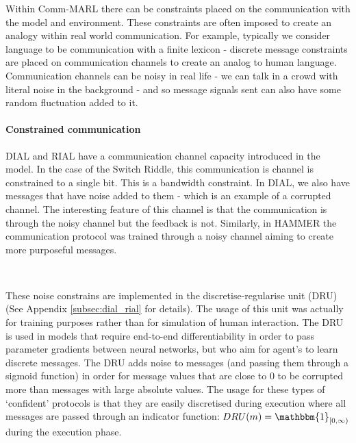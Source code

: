 \documentclass{article}
\begin{document}
Within Comm-MARL there can be constraints placed on the communication with the model and environment. These constraints are often imposed to create an analogy within real world communication. For example, typically we consider language to be communication with a finite lexicon - discrete message constraints are placed on communication channels to create an analog to human language. Communication channels can be noisy in real life - we can talk in a crowd with literal noise in the background - and so message signals sent can also have some random fluctuation added to it.

\paragraph{Constrained communication} DIAL and RIAL \citep{foerster2016learning} have a communication channel capacity introduced in the model. In the case of the Switch Riddle, this communication is channel is constrained to a single bit. This is a bandwidth constraint. In DIAL, we also have messages that have noise added to them - which is an example of a corrupted channel. The interesting feature of this channel is that the communication is through the noisy channel but the feedback is not. Similarly, in HAMMER \citep{gupta2022HAMMER} the communication protocol was trained through a noisy channel aiming to create more purposeful messages.

\

These noise constrains are implemented in the discretise-regularise unit (DRU) \citep{foerster2016learning} (See Appendix \ref{subsec:dial_rial} for details). The usage of this unit was actually for training purposes rather than for simulation of human interaction. The DRU is used in models that require end-to-end differentiability in order to pass parameter gradients between neural networks, but who aim for agent's to learn discrete messages. The DRU adds noise to messages (and passing them through a sigmoid function) in order for message values that are close to 0 to be corrupted more than messages with large absolute values. The usage for these types of `confident' protocols is that they are easily discretised during execution where all messages are passed through an indicator function: $DRU(m) = \mathbbm{1}_{[0, \infty)}$ during the execution phase. 
\end{document}
